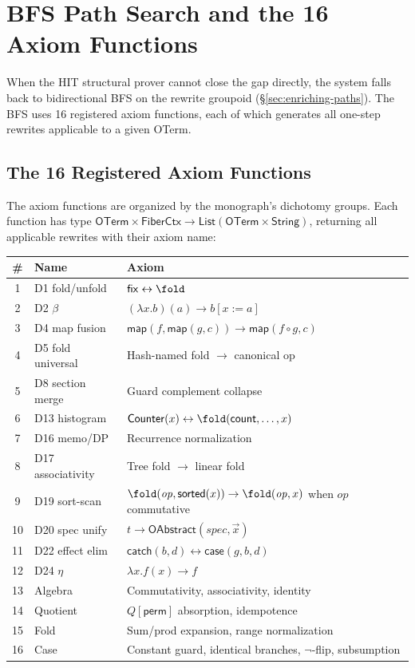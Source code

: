 \section{BFS Path Search and the 16 Axiom Functions}
\label{sec:bfs-axioms}

When the HIT structural prover cannot close the gap directly,
the system falls back to bidirectional BFS on the rewrite
groupoid (\S\ref{sec:enriching-paths}).  The BFS uses 16
registered axiom functions, each of which generates all
one-step rewrites applicable to a given OTerm.

\subsection{The 16 Registered Axiom Functions}

The axiom functions are organized by the monograph's dichotomy
groups.  Each function has type
$\mathsf{OTerm} \times \mathsf{FiberCtx} \to
\mathsf{List}(\mathsf{OTerm} \times \mathsf{String})$,
returning all applicable rewrites with their axiom name:

\begin{center}
\begin{tabular}{clp{5.5cm}}
\hline
\textbf{\#} & \textbf{Name} & \textbf{Axiom} \\
\hline
1 & D1 fold/unfold & $\mathsf{fix} \leftrightarrow \fold$ \\
2 & D2 $\beta$ & $(\lambda x.b)(a) \to b[x := a]$ \\
3 & D4 map fusion & $\mathsf{map}(f, \mathsf{map}(g, c)) \to \mathsf{map}(f \circ g, c)$ \\
4 & D5 fold universal & Hash-named fold $\to$ canonical op \\
5 & D8 section merge & Guard complement collapse \\
6 & D13 histogram & $\mathsf{Counter}(x) \leftrightarrow \fold(\mathsf{count}, \ldots, x)$ \\
7 & D16 memo/DP & Recurrence normalization \\
8 & D17 associativity & Tree fold $\to$ linear fold \\
9 & D19 sort-scan & $\fold(\mathit{op}, \mathsf{sorted}(x)) \to \fold(\mathit{op}, x)$ when $\mathit{op}$ commutative \\
10 & D20 spec unify & $t \to \mathsf{OAbstract}(\mathit{spec}, \vec{x})$ \\
11 & D22 effect elim & $\mathsf{catch}(b, d) \leftrightarrow \mathsf{case}(g, b, d)$ \\
12 & D24 $\eta$ & $\lambda x.f(x) \to f$ \\
13 & Algebra & Commutativity, associativity, identity \\
14 & Quotient & $Q[\mathsf{perm}]$ absorption, idempotence \\
15 & Fold & Sum/prod expansion, range normalization \\
16 & Case & Constant guard, identical branches, $\lnot$-flip, subsumption \\
\hline
\end{tabular}
\end{center}

